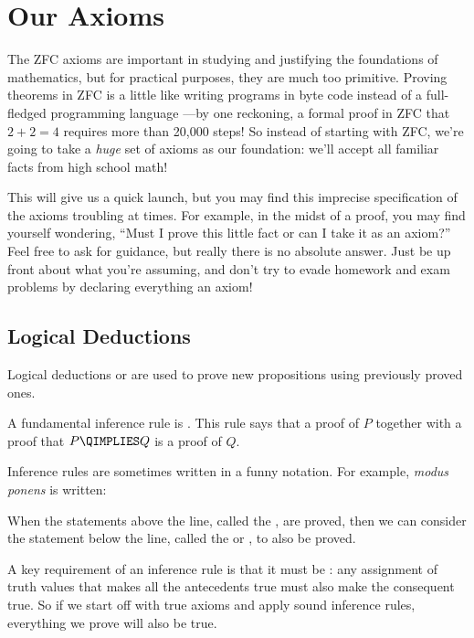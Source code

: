 
\section{Our Axioms}

The ZFC axioms are important in studying and justifying the foundations of
mathematics, but for practical purposes, they are much too primitive.
Proving theorems in ZFC is a little like writing programs in byte code
instead of a full-fledged programming language ---by one reckoning, a
formal proof in ZFC that $2 + 2 = 4$ requires more than 20,000 steps!  So
instead of starting with ZFC, we're going to take a \textit{huge} set of
axioms as our foundation: we'll accept all familiar facts from high school
math!

This will give us a quick launch, but you may find this imprecise
specification of the axioms troubling at times.  For example, in the midst
of a proof, you may find yourself wondering, ``Must I prove this little
fact or can I take it as an axiom?''  Feel free to ask for guidance, but
really there is no absolute answer.  Just be up front about what you're
assuming, and don't try to evade homework and exam problems by declaring
everything an axiom!

\subsection{Logical Deductions}

Logical deductions or  are used to prove new
propositions using previously proved ones.

A fundamental inference rule is .  This rule says that
a proof of $P$ together with a proof that $P \QIMPLIES Q$ is a proof of
$Q$.

Inference rules are sometimes written in a funny notation.  For example,
\emph{modus ponens} is written:
\begin{rul*}
\end{rul*}

When the statements above the line, called the , are
proved, then we can consider the statement below the line, called the
 or , to also be proved.

A key requirement of an inference rule is that it must be : any
assignment of truth values that makes all the antecedents true must also
make the consequent true.  So if we start off with true axioms and apply
sound inference rules, everything we prove will also be true.

